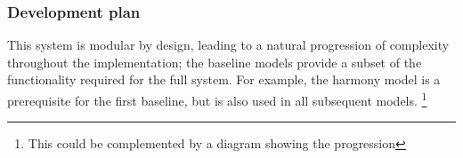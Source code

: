 \documentclass[12pt,a4paper,twoside,openany]{report} \usepackage[pdfborder={0 0 0}]{hyperref}    %
\DeclareMathOperator*{\argmax}{arg\,max} \DeclareMathOperator*{\argmin}{arg\,min}
\theoremstyle{definition} \newtheorem{definition}{Definition}[section]
\begin{document}
    \subsubsection{Development plan} This system is modular by design, leading to a natural progression of complexity
    throughout the implementation; the baseline models provide a subset of the functionality required for the full
    system. For example, the harmony model is a prerequisite for the first baseline, but is also used in all subsequent
    models. \footnote{This could be complemented by a diagram showing the progression}


\end{document}
